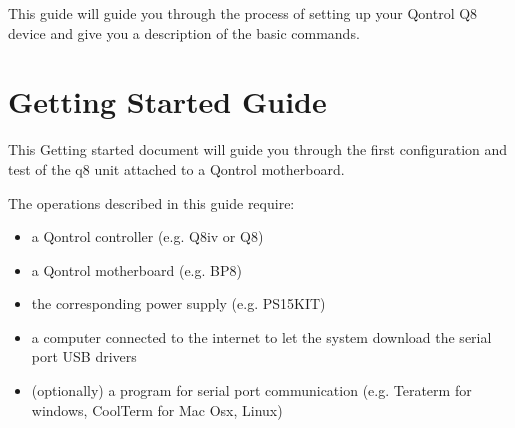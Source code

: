 \documentclass[letterpaper,10pt,english]{sphinxmanual}
\begin{document}
This guide will guide you through the process of setting up your Qontrol Q8 device and give you a description of the basic commands.


\chapter{Getting Started Guide}
\label{\detokenize{guide/getting_started::doc}}\label{\detokenize{guide/getting_started:getting-started-guide}}
This Getting started document will guide you through the first configuration and test of the q8 unit
attached to a Qontrol motherboard.

The operations described in this guide require:
\begin{itemize}
\item {} 
a Qontrol controller (e.g. Q8iv or Q8)

\item {} 
a Qontrol motherboard (e.g. BP8)

\item {} 
the corresponding power supply (e.g. PS15KIT)

\item {} 
a computer connected to the internet to let the system download the serial port USB drivers

\item {} 
(optionally) a program for serial port communication (e.g. Teraterm for windows, CoolTerm for Mac Osx, Linux)

\end{itemize}
\end{document}
